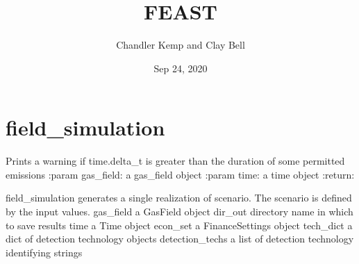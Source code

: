 \documentclass[letterpaper,10pt,english]{sphinxmanual}
\title{FEAST}
\date{Sep 24, 2020}
\author{Chandler Kemp and Clay Bell}
\begin{document}
\pagestyle{empty}
\sphinxmaketitle
\pagestyle{plain}
\sphinxtableofcontents
\pagestyle{normal}
\label{\detokenize{index::doc}}



\chapter{field\_simulation}
\label{\detokenize{index:module-feast.field_simulation}}\label{\detokenize{index:field-simulation}}

\begin{fulllineitems}
\label{\detokenize{index:feast.field_simulation.check_timestep}}
Prints a warning if time.delta\_t is greater than the duration of some permitted emissions
:param gas\_field: a gas\_field object
:param time: a time object
:return:

\end{fulllineitems}


\begin{fulllineitems}
\label{\detokenize{index:feast.field_simulation.field_simulation}}
field\_simulation generates a single realization of scenario. The scenario is defined by the input values.
gas\_field           a GasField object
dir\_out             directory name in which to save results
time                a Time object
econ\_set            a FinanceSettings object
tech\_dict           a dict of detection technology objects
detection\_techs     a list of detection technology identifying strings

\end{fulllineitems}
\end{document}
